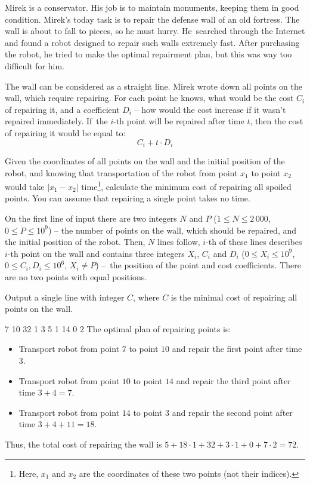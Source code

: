

Mirek is a conservator.
His job is to maintain monuments, keeping them in good condition.
Mirek's today task is to repair the defense wall of an old fortress.
The wall is about to fall to pieces, so he must hurry.
He~searched through the Internet and found a robot designed to repair such walls extremely fast.
After purchasing the robot, he tried to make the optimal repairment plan, but this was way too difficult for him.

The wall can be considered as a straight line.
Mirek wrote down all points on the wall, which require repairing.
For each point he knows, what would be the cost $C_i$ of repairing it, and a coefficient $D_i$
	-- how would the cost increase if it wasn't repaired immediately.
If~the $i$-th point will be repaired after time $t$, then the cost of repairing it would be equal to:
\[ C_i + t \cdot D_i \]


Given the coordinates of all points on the wall and the initial position of the robot,
	and knowing that transportation of the robot from
	point $x_1$ to point $x_2$ would take $|x_1 - x_2|$
	time\footnote{Here, $x_1$ and $x_2$ are the coordinates of these two points (not their indices).},
	calculate the minimum cost of repairing all spoiled points.
You can assume that repairing a single point takes no time.


On the first line of input there are two integers $N$ and $P$ ($1 \le N \le 2\,000$, $0 \le P \le 10^9$)
	-- the number of points on the wall, which should be repaired, and the initial position of the robot.
Then, $N$ lines follow, $i$-th of these lines describes $i$-th point on the wall
	and contains three integers $X_i$, $C_i$ and $D_i$ ($0 \le X_i \le 10^9$, $0 \le C_i, D_i \le 10^6$, $X_i \neq P$)
	--~the position of the point and cost coefficients.
There are no two points with equal positions.


Output a single line with integer $C$, where $C$ is the minimal cost of repairing
	all points on the wall.



 7
10 32 1
3 5 1
14 0 2
\sampleCOMMENT
The optimal plan of repairing points is:
\begin{itemize}
	\item Transport robot from point $7$ to point $10$ and repair the first point after time $3$.
	\item Transport robot from point $10$ to point $14$ and repair the third point after time $3 + 4 = 7$.
	\item Transport robot from point $14$ to point $3$ and repair the second point after time $3 + 4 + 11 = 18$.
\end{itemize}
Thus, the total cost of repairing the wall is $5 + 18 \cdot 1 + 32 + 3 \cdot 1 + 0 + 7 \cdot 2 = 72$.
\sampleEND



